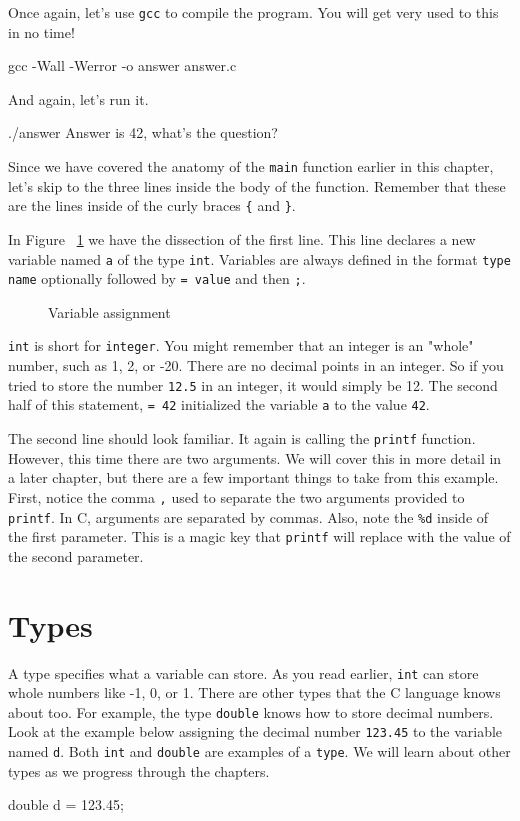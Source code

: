 \documentclass[12pt]{article}
\begin{document}
Once again, let's use \verb|gcc| to compile the program. You will get very used
to this in no time!

\begin{Terminal}
gcc -Wall -Werror -o answer answer.c
\end{Terminal}

And again, let's run it.

\begin{Terminal}
./answer
Answer is 42, what's the question?
\end{Terminal}

Since we have covered the anatomy of the \verb|main| function earlier in this
chapter, let's skip to the three lines inside the body of the function. Remember
that these are the lines inside of the curly braces \verb|{| and \verb|}|.

In Figure ~\ref{fig:assignment} we have the dissection of the first line.
This line declares a new variable named \verb|a| of the type \verb|int|.
Variables are always defined in the format \verb|type name| optionally
followed by \verb|= value| and then \verb|;|.

\begin{figure}
	\centering
	
	\caption{Variable assignment}
	\label{fig:assignment}
\end{figure}

\verb|int| is short for \verb|integer|.  You might remember that an integer is
an "whole" number, such as 1, 2, or -20.  There are no decimal points in an
integer. So if you tried to store the number \verb|12.5| in an integer, it
would simply be 12. The second half of this statement, \verb|= 42| initialized
the variable \verb|a| to the value \verb|42|.

The second line should look familiar. It again is calling the \verb|printf|
function. However, this time there are two arguments. We will cover this in
more detail in a later chapter, but there are a few important things to take
from this example. First, notice the comma \verb|,| used to separate the two
arguments provided to \verb|printf|. In C, arguments are separated by commas.
Also, note the \verb|%d| inside of the first parameter. This is a magic key
that \verb|printf| will replace with the value of the second parameter.

\section{Types}

A type specifies what a variable can store. As you read earlier, \verb|int| can
store whole numbers like -1, 0, or 1. There are other types that the C language
knows about too. For example, the type \verb|double| knows how to store decimal
numbers. Look at the example below assigning the decimal number \verb|123.45|
to the variable named \verb|d|. Both \verb|int| and \verb|double| are examples
of a \verb|type|. We will learn about other types as we progress through the
chapters.

\begin{Terminal}
double d = 123.45;
\end{Terminal}
\end{document}
